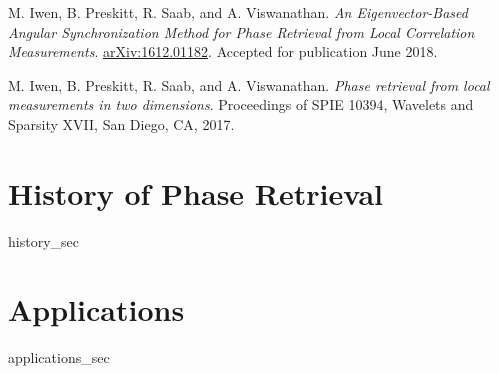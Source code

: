 \documentclass[12pt]{ucsd-thesis-2018}
\begin{document}
\begin{frontmatter}
\begin{vitapage}
\begin{publications}
\item  M. Iwen, B. Preskitt, R. Saab, and A. Viswanathan.  \emph{An Eigenvector-Based Angular Synchronization Method for Phase Retrieval from Local Correlation Measurements}.  \href{https://arxiv.org/abs/1612.01182}{arXiv:1612.01182}.  Accepted for publication June 2018.
  \item M. Iwen, B. Preskitt, R. Saab, and A. Viswanathan.  \emph{Phase retrieval from local measurements in two dimensions}.  Proceedings of SPIE 10394, Wavelets and Sparsity XVII, San Diego, CA, 2017.
\end{publications}

\end{vitapage}

\begin{abstract}

\end{abstract}

\end{frontmatter}

\chapter{History of Phase Retrieval}
{history_sec}

\chapter{Applications}
{applications_sec}
\end{document}

